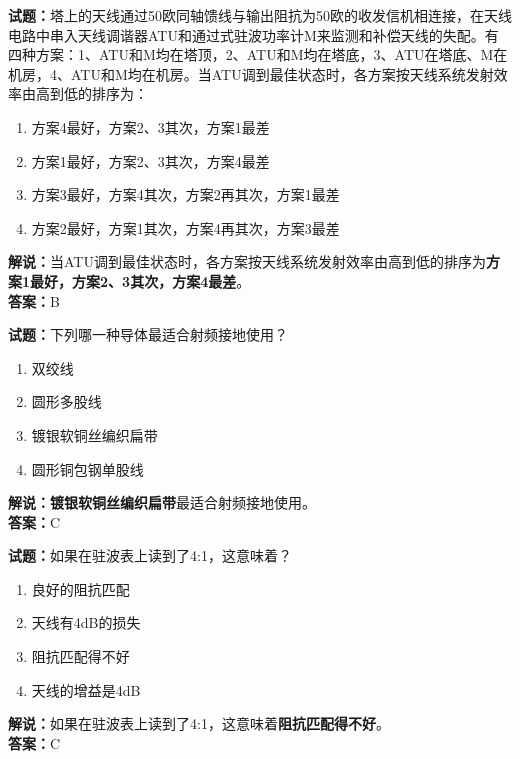 \documentclass{ctexbook}
\begin{document}
\bigskip


\noindent\textbf{试题：}塔上的天线通过50欧同轴馈线与输出阻抗为50欧的收发信机相连接，在天线电路中串入天线调谐器ATU和通过式驻波功率计M来监测和补偿天线的失配。有四种方案：1、ATU和M均在塔顶，2、ATU和M均在塔底，3、ATU在塔底、M在机房，4、ATU和M均在机房。当ATU调到最佳状态时，各方案按天线系统发射效率由高到低的排序为：
\begin{enumerate}[leftmargin=3em]
\item 方案4最好，方案2、3其次，方案1最差
\item 方案1最好，方案2、3其次，方案4最差
\item 方案3最好，方案4其次，方案2再其次，方案1最差
\item 方案2最好，方案1其次，方案4再其次，方案3最差
\end{enumerate}
\noindent\textbf{解说：}当ATU调到最佳状态时，各方案按天线系统发射效率由高到低的排序为\textbf{方案1最好，方案2、3其次，方案4最差}。\\\noindent\textbf{答案：}B


\bigskip


\noindent\textbf{试题：}下列哪一种导体最适合射频接地使用？
\begin{enumerate}[leftmargin=3em]
\item 双绞线
\item 圆形多股线
\item 镀银软铜丝编织扁带
\item 圆形铜包钢单股线
\end{enumerate}
\noindent\textbf{解说：}\textbf{镀银软铜丝编织扁带}最适合射频接地使用。\\\noindent\textbf{答案：}C



\bigskip


\noindent\textbf{试题：}如果在驻波表上读到了4:1，这意味着？
\begin{enumerate}[leftmargin=3em]
\item 良好的阻抗匹配
\item 天线有4dB的损失
\item 阻抗匹配得不好
\item 天线的增益是4dB
\end{enumerate}
\noindent\textbf{解说：}如果在驻波表上读到了4:1，这意味着\textbf{阻抗匹配得不好}。\\\noindent\textbf{答案：}C



\bigskip
\end{document}
